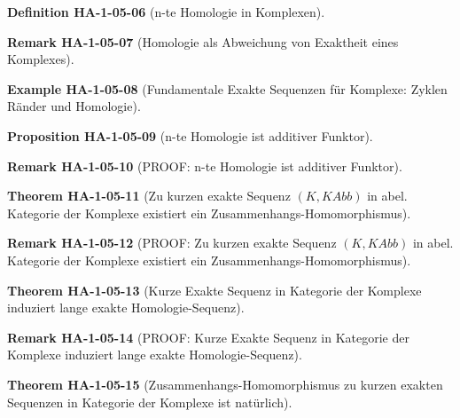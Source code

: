 \documentclass[10pt, letterpaper]{article}
\newcommand{\CustomHeading}[3]{%
  \par\medskip\noindent%
  \textbf{#1 #2} \textnormal{(#3)}.\enskip%
}
\newenvironment{DEF}[2]{\CustomHeading{Definition}{#1}{#2}}{}
\newenvironment{PROP}[2]{\CustomHeading{Proposition}{#1}{#2}}{}
\newenvironment{THEO}[2]{\CustomHeading{Theorem}{#1}{#2}}{}
\newenvironment{REM}[2]{\CustomHeading{Remark}{#1}{#2}}{}
\newenvironment{EXA}[2]{\CustomHeading{Example}{#1}{#2}}{}
\begin{document}
\begin{DEF}{HA-1-05-06}{n-te Homologie in Komplexen}
\end{DEF}

\begin{REM}{HA-1-05-07}{Homologie als Abweichung von Exaktheit eines Komplexes}
\end{REM}

\begin{EXA}{HA-1-05-08}{Fundamentale Exakte Sequenzen für Komplexe: Zyklen Ränder und Homologie}
\end{EXA}

\begin{PROP}{HA-1-05-09}{n-te Homologie ist additiver Funktor}
\end{PROP}

\begin{REM}{HA-1-05-10}{PROOF: n-te Homologie ist additiver Funktor}
\end{REM}

\begin{THEO}{HA-1-05-11}{Zu kurzen exakte Sequenz $(K,KAbb)$ in abel. Kategorie der Komplexe existiert ein Zusammenhangs-Homomorphismus}
\end{THEO}

\begin{REM}{HA-1-05-12}{PROOF: Zu kurzen exakte Sequenz $(K,KAbb)$ in abel. Kategorie der Komplexe existiert ein Zusammenhangs-Homomorphismus}
\end{REM}

\begin{THEO}{HA-1-05-13}{Kurze Exakte Sequenz in Kategorie der Komplexe induziert lange exakte Homologie-Sequenz}
\end{THEO}

\begin{REM}{HA-1-05-14}{PROOF: Kurze Exakte Sequenz in Kategorie der Komplexe induziert lange exakte Homologie-Sequenz}
\end{REM}

\begin{THEO}{HA-1-05-15}{Zusammenhangs-Homomorphismus zu kurzen exakten Sequenzen in Kategorie der Komplexe ist natürlich}
\end{THEO}
\end{document}
